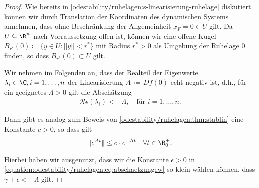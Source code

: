 \documentclass[letterpaper,10pt,english]{jupyterBook}
\begin{document}
\begin{proof}
 Wie bereits in \cref{odestability/ruhelagen:s-linearisierung-ruhelage}  diskutiert können wir durch Translation der Koordinaten des dynamischen Systems annehmen, dass ohne Beschränkung der Allgemeinheit \(x_F = 0 \in U\) gilt.
Da \(U\subseteq\R^n\) nach Vorraussetzung offen ist, können wir eine offene Kugel \(B_{{r^\ast}}(0) \coloneqq \{y \in U \colon ||y|| < {r^\ast}\}\) mit Radius \({r^\ast} > 0\) als Umgebung der Ruhelage \(0\) finden, so dass \(B_{r^\ast}(0) \subset U\) gilt.

\par
Wir nehmen im Folgenden an, dass der Realteil der Eigenwerte \(\lambda_i \in \C, i=1,\ldots,n\) der Linearisierung \(A \, \coloneqq \, Df(0)\) echt negativ ist, d.h., für ein geeignetes \(\Lambda > 0\) gilt die Abschätzung
\begin{align*}
\mathcal{Re}(\lambda_i)< -\Lambda, \quad \text{für } i=1,\ldots,n.\end{align*}
\par
Dann gibt es analog zum Beweis von \cref{odestability/ruhelagen:thm:stablin} eine Konstante \(c>0\), so dass gilt
\begin{align}\label{equation:odestability/ruhelagen:eq:normexp}
\|e^{At}\| \leq c\cdot e^{-\Lambda t}\quad \forall t\in \R^+_0.
\end{align}
\par
Hierbei haben wir ausgenutzt, dass wir die Konstante \(\epsilon > 0\) in \eqref{equation:odestability/ruhelagen:eq:abschaetzungew} so klein wählen können, dass \(\gamma + \epsilon < -\Lambda\) gilt.


\end{proof}
\end{document}
